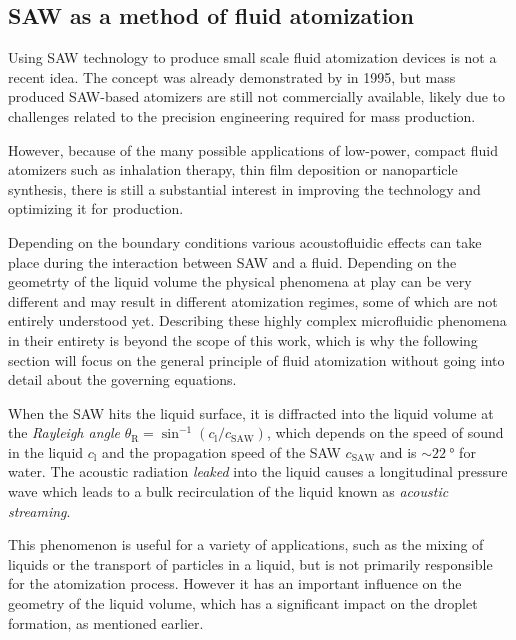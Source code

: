 \subsection{SAW as a method of fluid atomization}
\label{sec:saw_vapour}

Using SAW technology to produce small scale fluid atomization devices is not a recent idea. 
The concept was already demonstrated by  in 1995, but mass produced SAW-based atomizers are still not commercially available, likely due to challenges related to the precision engineering required for mass production.

However, because of the many possible applications of low-power, compact fluid atomizers such as inhalation therapy, thin film deposition or nanoparticle synthesis, there is still a substantial interest in improving the technology and optimizing it for production.

Depending on the boundary conditions various acoustofluidic effects can take place during the interaction between SAW and a fluid. \cite{winklerSAWbasedFluidAtomization2015a}
Depending on the geometrty of the liquid volume the physical phenomena at play can be very different and may result in different atomization regimes, some of which are not entirely understood yet. \cite{collinsAtomizationThinWater2012,huangExperimentalResearchSurface2022}
Describing these highly complex microfluidic phenomena in their entirety is beyond the scope of this work, which is why the following section will focus on the general principle of fluid atomization without going into detail about the governing equations.

When the SAW hits the liquid surface, it is diffracted into the liquid volume at the \emph{Rayleigh angle} $\theta_\text{R} = \sin^{-1}(c_\text{l}/c_\text{SAW})$, which depends on the speed of sound in the liquid $c_\text{l}$ and the propagation speed of the SAW $c_\text{SAW}$ and is $\sim\SI{22}{\degree}$ for water.
The acoustic radiation \emph{leaked} into the liquid causes a longitudinal pressure wave which leads to a bulk recirculation of the liquid known as \emph{acoustic streaming}.

This phenomenon is useful for a variety of applications, such as the mixing of liquids or the transport of particles in a liquid, but is not primarily responsible for the atomization process.
However it has an important influence on the geometry of the liquid volume, which has a significant impact on the droplet formation, as mentioned earlier.

